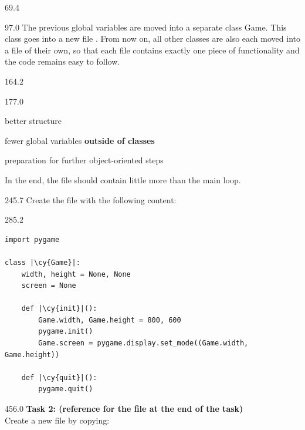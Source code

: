 \documentclass{aslab}
\newcommand*\codemd[1]{{\mdseries\codearg{#1}}}
\newcommand*\cy[1]{\textcolor{codecyan}{#1}}
\begin{document}
\nextpage
\begin{region}{69.4}
\end{region}

\begin{region}[pitch=13.3]{97.0}
The previous global variables are moved into a separate class Game. This
class goes into a new file . From now on, all other classes are
also each moved into a file of their own, so that each file contains exactly
one piece of functionality and the code remains easy to follow.
\end{region}

\begin{region}{164.2}
\end{region}

\begin{region}[pitch=13.8]{177.0}
\begin{dashlist}
\item better structure
\item fewer global variables \textbf{outside of classes}
\item preparation for further object-oriented steps
\end{dashlist}
In the end, the file  should contain little more than the
main loop.
\end{region}

\begin{region}[pitch=13.6]{245.7}
Create the file  with the following content:
\end{region}

\begin{region}[pitch=11]{285.2}
\begin{lstlisting}[style=pynsmall]
import pygame

class |\cy{Game}|:
    width, height = None, None
    screen = None

    def |\cy{init}|():
        Game.width, Game.height = 800, 600
        pygame.init()
        Game.screen = pygame.display.set_mode((Game.width, Game.height))

    def |\cy{quit}|():
        pygame.quit()
\end{lstlisting}
\end{region}

\begin{region}[pitch=13.6]{456.0}
\textbf{Task 2: \codemd{ball.py} (reference for the file at the end of the
task)}\\
Create a new file  by copying: 
\end{region}
\end{document}
